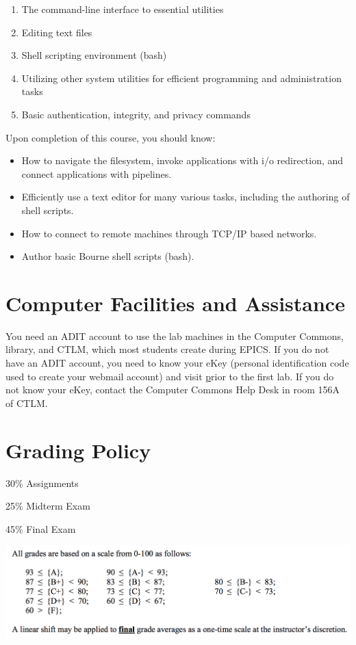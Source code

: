 \documentclass[12pt]{article}
\begin{document}
\begin{enumerate}
  \item The command-line interface to essential utilities
  \item Editing text files
  \item Shell scripting environment (bash)
  \item Utilizing other system utilities for efficient programming and administration tasks
  \item Basic authentication, integrity, and privacy commands 
\end{enumerate}

Upon completion of this course, you should know:
\begin{itemize}
  \item How to navigate the filesystem, invoke applications with i/o redirection, and connect applications with pipelines.
  \item Efficiently use a text editor for many various tasks, including the authoring of shell scripts.
  \item How to connect to remote machines through TCP/IP based networks.
  \item Author basic Bourne shell scripts (bash). 
\end{itemize}
\section{Computer Facilities and Assistance}
You need an ADIT account to use the lab machines in the Computer Commons, library, and CTLM, which most students create during EPICS. If you do not
have an ADIT account, you need to know your eKey (personal identification code used to create your webmail account) and visit
\href{http://newuser.mines.edu/adit} prior to the first lab. If you do not know your eKey, contact the Computer Commons Help Desk in room 156A of CTLM.
\section{Grading Policy}
\begin{description}
  \item{30\%} Assignments
  \item{25\%} Midterm Exam
  \item{45\%} Final Exam
\end{description}

\includegraphics[width=\linewidth]{scale}
  
\end{document}
